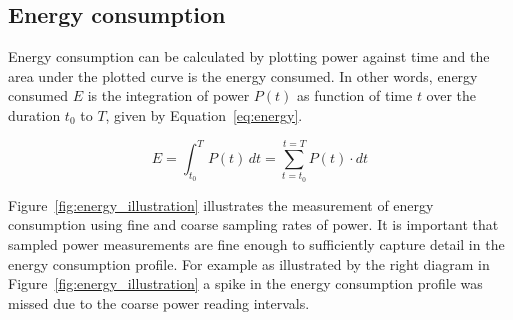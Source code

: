 







\subsection{Energy consumption}
Energy consumption can be calculated by plotting power against time and the area under the plotted curve is the energy consumed.
%
In other words, energy consumed $E$ is the integration of power $P(t)$ as function of time $t$ over the duration $t_0$ to $T$, given by Equation~\ref{eq:energy}.

\begin{equation}
    E = \int_{t_0}^{T} P(t) \,dt = \sum_{t=t_0}^{t=T} P(t)\cdot  dt
    \label{eq:energy}
\end{equation}

Figure~\ref{fig:energy_illustration} illustrates the measurement of energy consumption using fine and coarse sampling rates of power. It is important that sampled power measurements are fine enough to sufficiently capture detail in the energy consumption profile. For example as illustrated by the right diagram in Figure~\ref{fig:energy_illustration} a spike in the energy consumption profile was missed due to the coarse power reading intervals.

